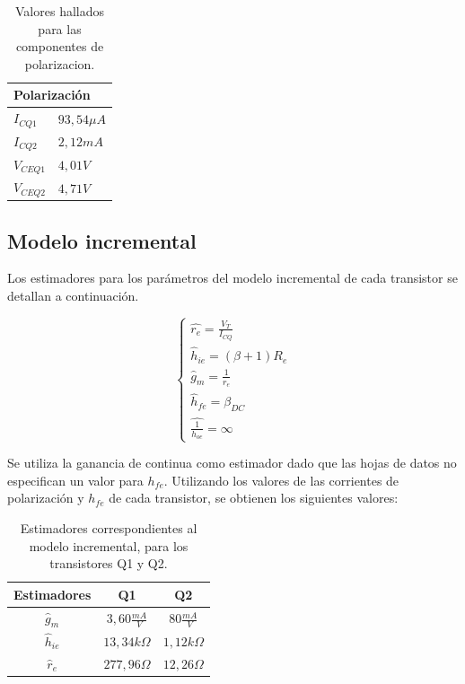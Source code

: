 \begin{table}[H]
	\centering
\begin{tabular}{ll}
\multicolumn{2}{l}{Polarización} \\ \hline
$I_{CQ1}$          & $93,54\mu A$       \\
$I_{CQ2}$        & $2,12mA$        \\
$V_{CEQ1}$         & $4,01V$       \\
$V_{CEQ2}$         & $4,71V$      
\end{tabular}
\caption{Valores hallados para las componentes de polarizacion.}
\label{tabla_valores_polarizacion}  
\end{table}


	\subsection{Modelo incremental}
	
	Los estimadores para los parámetros del modelo incremental de cada transistor se detallan a continuación.

		\begin{equation}
			\begin{cases}
			\widehat{r_{e}}=\frac{V_{T}}{I_{CQ}}\\
			{\widehat{h}_{ie}}=(\beta+1)R_{e}\\	
			{\widehat{g}_m}=\frac{1}{r_{e}}\\
			{\widehat{h}_{fe}}= \beta_{DC}\\
			\widehat{\frac{1}{h_{oe}}}= \infty
			\end{cases}
			\label{mod_inc_ecs}
		\end{equation}
		
	Se utiliza la ganancia de continua como estimador dado que las hojas de datos no especifican un valor para $h_{fe}$. Utilizando los valores de las corrientes de polarización y $h_{fe}$ de cada transistor, se obtienen los siguientes valores:
	

	\begin{table}[h!]
		\centering
		\begin{tabular}{c c c}%
			\bfseries Estimadores & Q1 & Q2 \\ \hline
			$\widehat{g}_m$ & $3,60 \frac{mA}{V}$  & $80\frac{mA}{V}$ \\
			$\widehat{h}_{ie}$ & $13,34k\Omega$ &$1,12k\Omega$ \\
			$\widehat{r}_{e}$& $277,96\Omega$ &$12,26\Omega$ \\
			\hline
		\end{tabular}
		\caption{Estimadores correspondientes al modelo incremental, para los transistores Q1 y Q2.}
		\label{avolf}
	\end{table}
	
